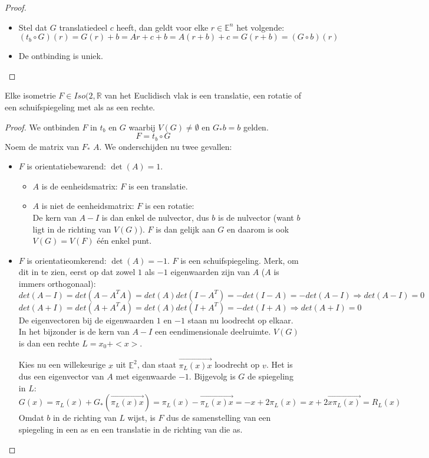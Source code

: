 \documentclass[main.tex]{subfiles}
\begin{document}
\begin{st}
\begin{proof}
\begin{itemize}
  \item Stel dat $G$ translatiedeel $c$ heeft, dan geldt voor elke $r\in \mathbb{E}^{n}$ het volgende:
    \[ (t_{b}\circ G)(r) = G(r) + b = Ar + c + b = A(r+b)+c = G(r+b) = (G\circ b)(r) \]

  \item De ontbinding is uniek.
  \end{itemize}

  \end{proof}
\end{st}

\begin{st}
  Elke isometrie $F\in Iso(2,\mathbb{R}$ van het Euclidisch vlak is een translatie, een rotatie of een schuifspiegeling met als as een rechte.

  \begin{proof}
    We ontbinden $F$ in $t_{b}$ en $G$ waarbij $V(G) \neq \emptyset$ en $G_{*}b = b$ gelden.
    \[F = t_{b} \circ G\]
    Noem de matrix van $F_{*}$ $A$.
    We onderschijden nu twee gevallen:
    \begin{itemize}
    \item $F$ is orientatiebewarend: $\det(A) = 1$.
      \begin{itemize}
      \item $A$ is de eenheidsmatrix: $F$ is een translatie.
      \item $A$ is niet de eenheidsmatrix: $F$ is een rotatie:\\
        De kern van $A-I$ is dan enkel de nulvector, dus $b$ is de nulvector (want $b$ ligt in de richting van $V(G)$).
        $F$ is dan gelijk aan $G$ en daarom is ook $V(G) = V(F)$ \'e\'en enkel punt.
      \end{itemize}
    \item $F$ is orientatieomkerend: $\det(A) = -1$.
      $F$ is een schuifspiegeling.
      Merk, om dit in te zien, eerst op dat zowel $1$ als $-1$ eigenwaarden zijn van $A$ ($A$ is immers orthogonaal):
      \[ det(A-I) = det(A-A^{T}A) = det(A)det(I-A^{T}) = -det(I-A) = -det(A-I) \Rightarrow det(A-I) = 0 \]
      \[ det(A+I) = det(A+A^{T}A) = det(A)det(I+A^{T}) = -det(I+A) \Rightarrow det(A+I) = 0 \]
      De eigenvectoren bij de eigenwaarden $1$ en $-1$ staan nu loodrecht op elkaar.
      In het bijzonder is de kern van $A-I$ een eendimensionale deelruimte.
      $V(G)$ is dan een rechte $L=x_{0}+<x>$.

      Kies nu een willekeurige $x$ uit $\mathbb{E}^{2}$, dan staat $\overrightarrow{\pi_{L}(x)x}$ loodrecht op $v$.
      Het is dus een eigenvector van $A$ met eigenwaarde $-1$.
      Bijgevolg is $G$ de spiegeling in $L$:
      \[ G(x) = \pi_{L}(x) + G_{*}(\overrightarrow{\pi_{L}(x)x}) = \pi_{L}(x) - \overrightarrow{\pi_{L}(x)x} = -x + 2\pi_{L}(x) = x + 2\overrightarrow{x\pi_{L}(x)} = R_{L}(x) \]
      Omdat $b$ in de richting van $L$ wijst, is $F$ dus de samenstelling van een spiegeling in een as en een translatie in de richting van die as.
    \end{itemize}
  \end{proof}
\end{st}
\end{document}
